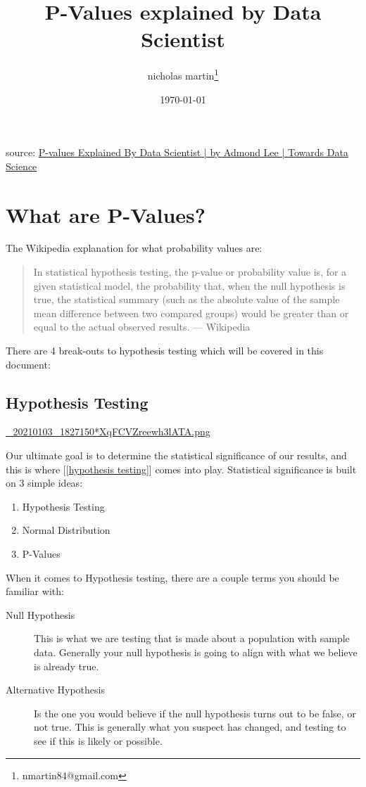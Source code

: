 \documentclass[11pt]{article}
\author{nicholas martin\thanks{nmartin84@gmail.com}}
\date{\today}
\title{P-Values explained by Data Scientist}
\begin{document}
\maketitle
\tableofcontents

source: \href{https://towardsdatascience.com/p-values-explained-by-data-scientist-f40a746cfc8}{P-values Explained By Data Scientist | by Admond Lee | Towards Data Science}

\section*{What are P-Values?}
\label{sec:org613448c}

The Wikipedia explanation for what probability values are:
\begin{quote}
In statistical hypothesis testing, the p-value or probability value is, for a
given statistical model, the probability that, when the null hypothesis is true,
the statistical summary (such as the absolute value of the sample mean
difference between two compared groups) would be greater than or equal to the
actual observed results.
— Wikipedia
\end{quote}

There are 4 break-outs to hypothesis testing which will be covered in this
document:

\subsection*{Hypothesis Testing}
\label{sec:org3f24929}
\href{../.attach/e6/622552-cc02-418e-838f-3137ba5a7798/\_20210103\_1827150*XqFCVZreewh3lATA.png}{\_20210103\_1827150*XqFCVZreewh3lATA.png}

Our ultimate goal is to determine the statistical significance of our results,
and this is where [[\href{../202101031336-hypothesis\_testing.org}{hypothesis testing}]] comes into play. Statistical
significance is built on 3 simple ideas:
\begin{enumerate}
\item Hypothesis Testing
\item Normal Distribution
\item P-Values
\end{enumerate}

When it comes to Hypothesis testing, there are a couple terms you should be
familiar with:
\begin{description}
\item[{Null Hypothesis}] This is what we are testing that is made about a population
with sample data. Generally your null hypothesis is going to align with what
we believe is already true.
\item[{Alternative Hypothesis}] Is the one you would believe if the null hypothesis
turns out to be false, or not true. This is generally what you suspect has
changed, and testing to see if this is likely or possible.
\end{description}
\end{document}
